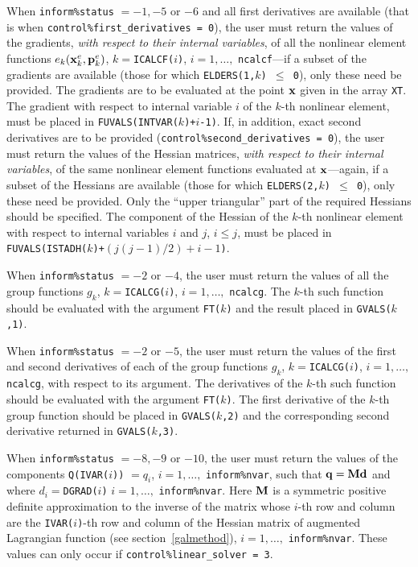 \documentclass{galahad}
\begin{document}
When {\tt inform\%status} $= -1, -5$ or $-6$
and all first derivatives are available
(that is when {\tt control\%first\_der\-ivat\-ives = 0}),
the user must return the values
of the gradients, {\em with respect to their internal variables}, of all
the nonlinear element functions
$e_k({\mathbf{x}}^e_k,{\mathbf{p}}^e_k)$,
$k = ${\tt  ICALCF($i$)}, $i=1,  \ldots,$ {\tt ncalcf}---if a subset of the
gradients are available (those for which {\tt ELDERS(1,$k$) $\leq$ 0}),
only these need be provided.
The gradients are to be evaluated at the point  ${\mathbf{x}}$ given in
the array  {\tt XT}.  The  gradient with respect  to internal variable
$i$ of the $k$-th nonlinear element,
must be placed in {\tt FUVALS(INTVAR($k$)+$i$-1)}.
If, in addition, exact second derivatives
are to be provided
({\tt control\%se\-cond\_derivatives = 0}), the user must return the values
of the Hessian matrices, {\em with respect to their internal variables},
of the same nonlinear element functions
evaluated at ${\mathbf{x}}$---again, if a subset of the
Hessians are available (those for which {\tt ELDERS(2,$k$) $\leq$ 0}),
only these need be provided.
Only the ``upper triangular'' part of the
required Hessians should be specified.
The component of the Hessian of the $k$-th nonlinear element
with respect to internal variables
$i$ and $j$, $i \leq j$,
must be  placed in {\tt FUVALS(ISTADH($k$)+$(j(j-1)/2)+i-1$)}.

When {\tt inform\%status} $ = -2$ or $- 4$, the user must return the values
of all the group functions
$g_k$, $k  = ${\tt ICALCG($i$)},   $i=1,  \ldots,$ {\tt ncalcg}.   The
$k$-th such  function  should  be  evaluated  with the argument
{\tt FT($k$)} and the result placed in {\tt GVALS($k$,1)}.

When {\tt inform\%status} $= -2$ or $-5$, the user must return the values
of the first and second derivatives of each of
the group functions
$g_k$, $k =  ${\tt   ICALCG($i$)}, $i=1, \ldots,$ {\tt  ncalcg},  with
respect to its argument.  The derivatives of the  $k$-th such function
should be  evaluated with   the   argument  {\tt FT($k$)}.  The  first
derivative
of the $k$-th group function should be placed in {\tt GVALS($k$,2)} and the
corresponding second derivative returned in {\tt GVALS($k$,3)}.

When {\tt inform\%status} $= -8, -9$ or $- 10$, the user must return the
values of the components {\tt Q(IVAR($i$))}
$= q_i$, $i = 1, \ldots,$ {\tt inform\%nvar}, such
that ${\mathbf{q}}={\mathbf{M}} {\mathbf{d}}$ and where $d_i=${\tt DGRAD($i$)} $i=1, \ldots,$
{\tt inform\%nvar}. Here ${\mathbf{M}}$ is a symmetric positive definite
approximation to the inverse of the matrix
whose $i$-th row and column are the
{\tt IVAR($i$)}-th row and column
of the Hessian matrix of augmented Lagrangian function (see
section~\ref{galmethod}),
$i = 1, \ldots,$ {\tt inform\%nvar}.
These values can only occur if {\tt control\%linear\_solver = 3}.
\end{document}
